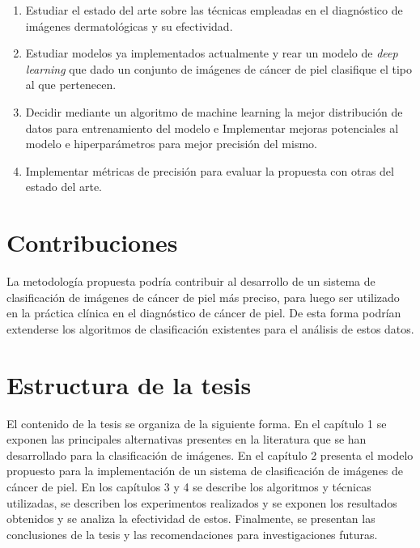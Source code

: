 \begin{enumerate}
    \item Estudiar el estado del arte sobre las técnicas empleadas en el diagnóstico de imágenes dermatológicas y su efectividad.
    \item Estudiar modelos ya implementados actualmente y rear un modelo de \textit{deep learning} que dado un conjunto de imágenes de cáncer de piel clasifique el tipo al que pertenecen.
    \item Decidir mediante un algoritmo de machine learning la mejor distribución de datos para entrenamiento del modelo e Implementar mejoras potenciales al modelo e hiperparámetros para mejor precisión del mismo.
    \item Implementar métricas de precisión para evaluar la propuesta con otras del estado del arte.
\end{enumerate}

\section*{Contribuciones}

La metodología propuesta podría contribuir al desarrollo de un sistema de clasificación de imágenes de cáncer de piel más preciso, para luego ser utilizado en la práctica clínica en el diagnóstico de cáncer de piel. De esta forma podrían extenderse los algoritmos de clasificación existentes para el análisis de estos datos. 

\section*{Estructura de la tesis}

El contenido de la tesis se organiza de la siguiente forma. En el capítulo 1 se exponen las principales alternativas presentes en la literatura que se han desarrollado para la clasificación de imágenes. En el capítulo 2 presenta el modelo propuesto para la implementación de un sistema de clasificación de imágenes de cáncer de piel. En los capítulos 3 y 4 se describe  los algoritmos y técnicas utilizadas, se describen los experimentos realizados y se exponen los resultados obtenidos y se analiza la efectividad de estos. Finalmente, se presentan las conclusiones de la tesis y las recomendaciones para investigaciones futuras.